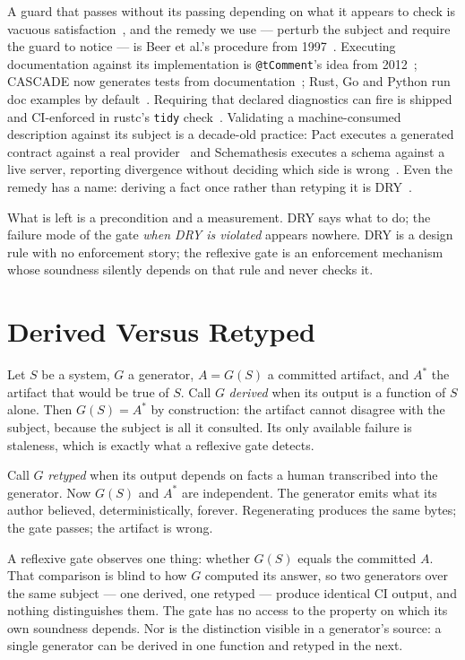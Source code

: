 \documentclass[10pt,conference]{IEEEtran}
\begin{document}
A guard that passes without its passing depending on what it appears to check is vacuous
satisfaction~\cite{ball2008vacuitytesting}, and the remedy we use --- perturb the subject
and require the guard to notice --- is Beer et al.'s procedure from
1997~\cite{beer1997vacuity}. Executing documentation against its implementation is
\texttt{@tComment}'s idea from 2012~\cite{tan2012tcomment}; CASCADE now generates tests
from documentation~\cite{kiecker2026cascade}; Rust, Go and Python run doc examples by
default~\cite{rust_doctests,go_testable_examples,python_doctest}. Requiring that declared
diagnostics can fire is shipped and CI-enforced in rustc's \texttt{tidy}
check~\cite{rustc_tidy_errorcodes}. Validating a machine-consumed description against its
subject is a decade-old practice: Pact executes a generated contract against a real
provider~\cite{pact_contract_testing} and Schemathesis executes a schema against a live
server, reporting divergence without deciding which side is
wrong~\cite{schemathesis}. Even the remedy has a name: deriving a fact once rather than
retyping it is DRY~\cite{hunt1999pragmatic}.

What is left is a precondition and a measurement. DRY says what to do; the failure mode of
the gate \emph{when DRY is violated} appears nowhere. DRY is a design rule with no
enforcement story; the reflexive gate is an enforcement mechanism whose soundness silently
depends on that rule and never checks it.

\section{Derived Versus Retyped}

Let $S$ be a system, $G$ a generator, $A = G(S)$ a committed artifact, and $A^{\ast}$ the
artifact that would be true of $S$. Call $G$ \emph{derived} when its output is a function
of $S$ alone. Then $G(S) = A^{\ast}$ by construction: the artifact cannot disagree with
the subject, because the subject is all it consulted. Its only available failure is
staleness, which is exactly what a reflexive gate detects.

Call $G$ \emph{retyped} when its output depends on facts a human transcribed into the
generator. Now $G(S)$ and $A^{\ast}$ are independent. The generator emits what its author
believed, deterministically, forever. Regenerating produces the same bytes; the gate
passes; the artifact is wrong.

A reflexive gate observes one thing: whether $G(S)$ equals the committed $A$. That
comparison is blind to how $G$ computed its answer, so two generators over the same
subject --- one derived, one retyped --- produce identical CI output, and nothing
distinguishes them. The gate has no access to the property on which its own soundness
depends. Nor is the distinction visible in a generator's source: a single generator can
be derived in one function and retyped in the next.
\end{document}
